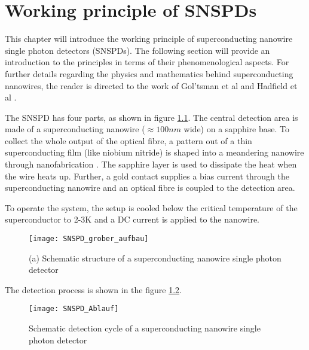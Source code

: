 \graphicspath{{/Users/maxim.re/Studium/Physik B.Sc./Semester_8_SS24/Proseminar/Figs Single Photon Detection/}}

\chapter{Working principle of SNSPDs}
\label{sec:SNSPD_working_principle}
This chapter will introduce the working principle of superconducting nanowire single photon detectors (SNSPDs).
The following section will provide an introduction to the principles in terms of their phenomenological aspects.
For further details regarding the physics and mathematics behind superconducting nanowires, the reader is directed
to the work of Gol’tsman et al \cite{goltsman-2001} and Hadfield et al \cite{natarajan-2012}.

The SNSPD has four parts, as shown in figure \ref{fig:SNSPD_rough_structure}.
The central detection area is made of a superconducting nanowire ($\approx 100nm$ wide) on a sapphire base.
To collect the whole output of the optical fibre, a pattern out of a
thin superconducting film (like niobium nitride) is shaped into a meandering nanowire through nanofabrication \cite{single-quantum-2022}.
The sapphire layer is used to dissipate the heat when the wire heats up.
Further, a gold contact supplies a bias current through the superconducting nanowire and an optical fibre is coupled to the detection area.

To operate the system, the setup is cooled below the critical temperature of the superconductor to
2-3K and a DC current is applied to the nanowire.

\begin{figure}[hhh]
    \centering
    \texttt{[image: SNSPD\_grober\_aufbau]}
    \caption{(a) Schematic structure of a superconducting nanowire single photon detector \cite{steudle-2012}}
    \label{fig:SNSPD_rough_structure}
\end{figure}

The detection process is shown in the figure \ref{fig: SNSPD_process}.

\begin{figure}[hhh]
    \centering
    \texttt{[image: SNSPD\_Ablauf]}
    \caption{Schematic detection cycle of a superconducting nanowire single photon detector \cite{singlequantum_snsd_nodate}}
    \label{fig: SNSPD_process}
\end{figure}

